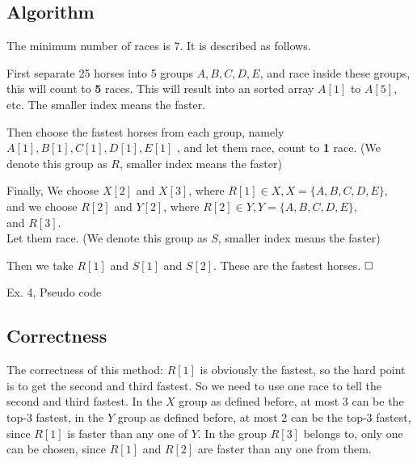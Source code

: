 \documentclass[A4paper]{article}
\newcommand{\qedhere}{$\hfill\ensuremath{\square}$}
\begin{document}
\subsection{Algorithm}
\par The minimum number of races is 7. It is described as follows.
\par First separate 25 horses into 5 groups $A, B, C, D, E$, and race inside these groups, this will count to \textbf{5} races. This will result into an sorted array $A[1]$ to $A[5]$, etc. The smaller index means the faster.
\par Then choose the fastest horses from each group, namely $A[1], B[1], C[1], D[1], E[1]$ , and let them race, count to \textbf{1} race. (We denote this group as $R$, smaller index means the faster)
\par Finally, We choose \underline{$X[2]$} and \underline{$X[3]$}, where $R[1] \in X, X=\{A, B, C, D, E\}$, \\ and we choose \underline{$R[2]$} and \underline{$Y[2]$}, where $R[2] \in Y, Y=\{A, B, C, D, E\}$, \\and \underline{$R[3]$}. \\Let them race. (We denote this group as $S$, smaller index means the faster)
\par Then we take $R[1]$ and $S[1]$ and $S[2]$. These are the fastest horses.
\qedhere 
\par 
\vspace*{1em}
\begin{algorithm}[H]
\BlankLine
{}
\caption{Ex. 4, Pseudo code}
\end{algorithm}

\subsection{Correctness}
The correctness of this method: $R[1]$ is obviously the fastest, so the hard point is to get the second and third fastest. So we need to use one race to tell the second and third fastest. In the $X$ group as defined before, at most 3 can be the top-3 fastest, in the $Y$ group as defined before, at most 2 can be the top-3 fastest, since $R[1]$ is faster than any one of $Y$. In the group $R[3]$ belongs to, only one can be chosen, since $R[1]$ and $R[2]$ are faster than any one from them. 
\end{document}
